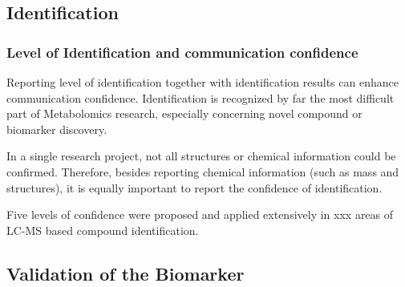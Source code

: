 \subsection{Identification}
\subsubsection{Level of Identification and communication confidence}
Reporting level of identification together with identification results can enhance communication confidence. Identification is recognized by far the most difficult part of Metabolomics research, especially concerning novel compound or biomarker discovery. 

In a single research project, not all structures or chemical information could be confirmed. Therefore, besides reporting chemical information (such as mass and structures), it is equally important to report the confidence of identification.

Five levels of confidence were proposed and applied extensively in xxx areas of LC-MS based compound identification\cite{?}.

\subsection{Validation of the Biomarker}

